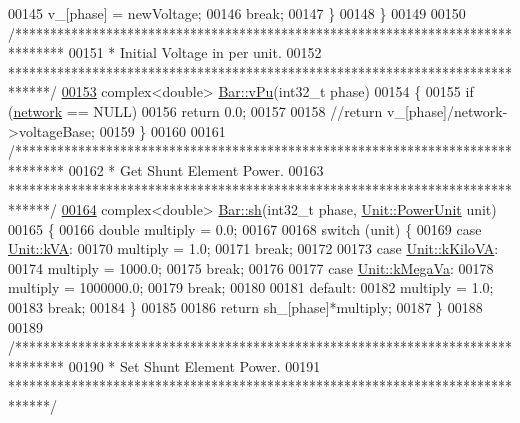 \begin{DoxyCode}
00145     v\_[phase] = newVoltage;
00146     \textcolor{keywordflow}{break};
00147   \}
00148 \}
00149 
00150 \textcolor{comment}{/*******************************************************************************}
00151 \textcolor{comment}{ * Initial Voltage in per unit.}
00152 \textcolor{comment}{ ******************************************************************************/}
\hypertarget{bar_8cpp_source_l00153}{}\hyperlink{group___models_ga1c54bd76b2f620d970ddfed8cdae4116}{00153} complex<double> \hyperlink{group___models_ga1c54bd76b2f620d970ddfed8cdae4116}{Bar::vPu}(int32\_t phase)
00154 \{
00155   \textcolor{keywordflow}{if} (\hyperlink{class_bar_a80025f13884750add58cc61b318357ff}{network} == NULL)
00156     \textcolor{keywordflow}{return} 0.0;
00157 
00158   \textcolor{comment}{//return v\_[phase]/network->voltageBase;}
00159 \}
00160 
00161 \textcolor{comment}{/*******************************************************************************}
00162 \textcolor{comment}{ * Get Shunt Element Power.}
00163 \textcolor{comment}{ ******************************************************************************/}
\hypertarget{bar_8cpp_source_l00164}{}\hyperlink{group___models_gac188071bf5f165b0acdaa4c8af82355c}{00164} complex<double> \hyperlink{group___models_gac188071bf5f165b0acdaa4c8af82355c}{Bar::sh}(int32\_t phase, \hyperlink{class_unit_ace265ae255370ccacfd5370337572c3b}{Unit::PowerUnit} unit)
00165 \{
00166   \textcolor{keywordtype}{double} multiply = 0.0;
00167 
00168   \textcolor{keywordflow}{switch} (unit) \{
00169   \textcolor{keywordflow}{case} \hyperlink{class_unit_ace265ae255370ccacfd5370337572c3ba72b181a842ae2759488a2fa1410d3696}{Unit::kVA}:
00170     multiply = 1.0;
00171     \textcolor{keywordflow}{break};
00172 
00173   \textcolor{keywordflow}{case} \hyperlink{class_unit_ace265ae255370ccacfd5370337572c3bac9e5154522fbb810d7aed75c3ff47cb2}{Unit::kKiloVA}:
00174     multiply = 1000.0;
00175     \textcolor{keywordflow}{break};
00176 
00177   \textcolor{keywordflow}{case} \hyperlink{class_unit_ace265ae255370ccacfd5370337572c3ba6039da0ed20f8bee64305bab8bdec365}{Unit::kMegaVa}:
00178     multiply = 1000000.0;
00179     \textcolor{keywordflow}{break};
00180 
00181   \textcolor{keywordflow}{default}:
00182     multiply = 1.0;
00183     \textcolor{keywordflow}{break};
00184   \}
00185 
00186   \textcolor{keywordflow}{return} sh\_[phase]*multiply;
00187 \}
00188 
00189 \textcolor{comment}{/*******************************************************************************}
00190 \textcolor{comment}{ * Set Shunt Element Power.}
00191 \textcolor{comment}{ ******************************************************************************/}

\end{DoxyCode}
